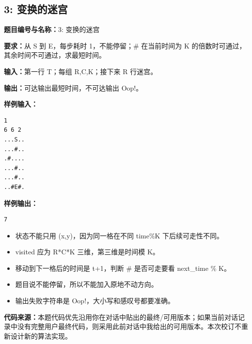 \documentclass[10pt,a4paper,fontset=none]{ctexart}
\newcommand{\codesource}{\par\noindent\textbf{代码来源：}本题代码优先沿用你在对话中贴出的最终/可用版本；如果当前对话记录中没有完整用户最终代码，则采用此前对话中我给出的可用版本。本次校订不重新设计新的算法实现。\par\vspace{0.2em}}
\begin{document}
\subsection{3: 变换的迷宫}
\begin{taskbox}
\textbf{题目编号与名称：}3: 变换的迷宫\par
\textbf{要求：}从 S 到 E，每步耗时 1，不能停留；\# 在当前时间为 K 的倍数时可通过，其余时间不可通过，求最短时间。\par
\textbf{输入：}第一行 T；每组 R,C,K；接下来 R 行迷宫。\par
\textbf{输出：}可达输出最短时间，不可达输出 Oop!。\par
\textbf{样例输入：}
\begin{lstlisting}[style=sample]
1
6 6 2
...S..
...#..
.#....
...#..
...#..
..#E#.
\end{lstlisting}
\textbf{样例输出：}
\begin{lstlisting}[style=sample]
7
\end{lstlisting}
\end{taskbox}
\begin{mistakebox}
\begin{itemize}
  \item 状态不能只用 (x,y)，因为同一格在不同 time\%K 下后续可走性不同。
  \item visited 应为 R*C*K 三维，第三维是时间模 K。
  \item 移动到下一格后的时间是 t+1，判断 \# 是否可走要看 next\_time \% K。
  \item 题目说不能停留，所以不能加入原地不动方向。
  \item 输出失败字符串是 Oop!，大小写和感叹号都要准确。
\end{itemize}
\end{mistakebox}
\codesource
\end{document}
